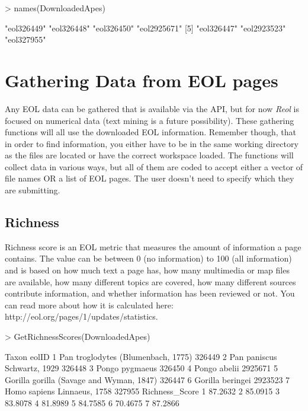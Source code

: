 \documentclass[12pt]{article}
\begin{document}
\begin{Schunk}
\begin{Sinput}
> names(DownloadedApes)
\end{Sinput}
\begin{Soutput}
[1] "eol326449"  "eol326448"  "eol326450"  "eol2925671"
[5] "eol326447"  "eol2923523" "eol327955" 
\end{Soutput}
\end{Schunk}

 \section{Gathering Data from EOL pages}
Any EOL data can be gathered that is available via the API, but for now \textit{Reol} is focused on numerical data (text mining is a future possibility). These gathering functions will all use the downloaded EOL information. Remember though, that in order to find information, you either have to be in the same working directory as the files are located or have the correct workspace loaded. The functions will collect data in various ways, but all of them are coded to accept either a vector of file names OR a list of EOL pages. The user doesn't need to specify which they are submitting. 

\subsection{Richness}
Richness score is an EOL metric that measures the amount of information a page contains. The value can be between 0 (no information) to 100 (all information) and is based on how much text a page has, how many multimedia or map files are available, how many different topics are covered, how many different sources contribute information, and whether information has been reviewed or not. You can read more about how it is calculated here: http://eol.org/pages/1/updates/statistics. 

\begin{Schunk}
\begin{Sinput}
> GetRichnessScores(DownloadedApes)
\end{Sinput}
\begin{Soutput}
                                     Taxon   eolID
1       Pan troglodytes (Blumenbach, 1775)  326449
2              Pan paniscus Schwartz, 1929  326448
3                           Pongo pygmaeus  326450
4                             Pongo abelii 2925671
5 Gorilla gorilla (Savage and Wyman, 1847)  326447
6                         Gorilla beringei 2923523
7              Homo sapiens Linnaeus, 1758  327955
  Richness_Score
1        87.2632
2        85.0915
3        83.8078
4        81.8989
5        84.7585
6        70.4675
7        87.2866
\end{Soutput}
\end{Schunk}
\end{document}
